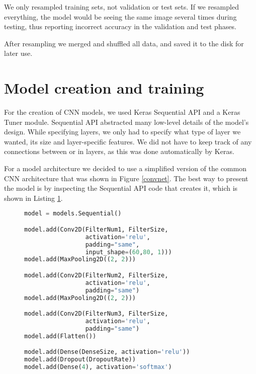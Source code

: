 We only resampled training sets, not validation or test sets.
If we resampled everything, the model would be seeing the same image several times during testing, thus reporting incorrect accuracy in the validation and test phases.

After resampling we merged and shuffled all data, and saved it to the disk for later use.

\newpage
\section{ Model creation and training}\label{cnn_ref}

For the creation of CNN models, we used Keras Sequential API and a Keras Tuner module.
Sequential API abstracted many low-level details of the model's design.
While specifying layers, we only had to specify what type of layer we wanted, its size and layer-specific features. 
We did not have to keep track of any connections between or in layers, as this was done automatically by Keras.

For a model architecture we decided to use a simplified version of the common CNN architecture that was shown in Figure \ref{convnet}.
The best way to present the model is by inspecting the Sequential API code that creates it, which is shown in Listing \ref{model_code}.

\lstset{style=mystyle}
\begin{figure}[ht] 
\begin{lstlisting}[language=Python]
model = models.Sequential()

model.add(Conv2D(FilterNum1, FilterSize, 
                 activation='relu', 
                 padding="same", 
                 input_shape=(60,80, 1)))
model.add(MaxPooling2D((2, 2)))

model.add(Conv2D(FilterNum2, FilterSize, 
                 activation='relu', 
                 padding="same")
model.add(MaxPooling2D((2, 2)))

model.add(Conv2D(FilterNum3, FilterSize, 
                 activation='relu', 
                 padding="same")
model.add(Flatten())

model.add(Dense(DenseSize, activation='relu'))
model.add(Dropout(DropoutRate))
model.add(Dense(4), activation='softmax')
\end{lstlisting}
\label{model_code}
\end{figure}


